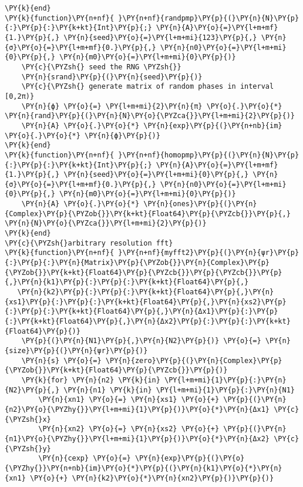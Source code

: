 \begin{Verbatim}[commandchars=\\\{\}]
\PY{k}{end}
\PY{k}{function}\PY{n+nf}{ }\PY{n+nf}{randpmp}\PY{p}{(}\PY{n}{N}\PY{p}{:}\PY{p}{:}\PY{k+kt}{Int}\PY{p}{;} \PY{n}{A}\PY{o}{=}\PY{l+m+mf}{1.}\PY{p}{,} \PY{n}{seed}\PY{o}{=}\PY{l+m+mi}{123}\PY{p}{,} \PY{n}{σ}\PY{o}{=}\PY{l+m+mf}{0.}\PY{p}{,} \PY{n}{n0}\PY{o}{=}\PY{l+m+mi}{0}\PY{p}{,} \PY{n}{m0}\PY{o}{=}\PY{l+m+mi}{0}\PY{p}{)}
    \PY{c}{\PYZsh{} seed the RNG \PYZsh{}}
    \PY{n}{srand}\PY{p}{(}\PY{n}{seed}\PY{p}{)}
    \PY{c}{\PYZsh{} generate matrix of random phases in interval [0,2π)}
    \PY{n}{ϕ} \PY{o}{=} \PY{l+m+mi}{2}\PY{n}{π} \PY{o}{.}\PY{o}{*} \PY{n}{rand}\PY{p}{(}\PY{n}{N}\PY{o}{\PYZca{}}\PY{l+m+mi}{2}\PY{p}{)}
    \PY{n}{A} \PY{o}{.}\PY{o}{*} \PY{n}{exp}\PY{p}{(}\PY{n+nb}{im} \PY{o}{.}\PY{o}{*} \PY{n}{ϕ}\PY{p}{)}
\PY{k}{end}
\PY{k}{function}\PY{n+nf}{ }\PY{n+nf}{homopmp}\PY{p}{(}\PY{n}{N}\PY{p}{:}\PY{p}{:}\PY{k+kt}{Int}\PY{p}{;} \PY{n}{A}\PY{o}{=}\PY{l+m+mf}{1.}\PY{p}{,} \PY{n}{seed}\PY{o}{=}\PY{l+m+mi}{0}\PY{p}{,} \PY{n}{σ}\PY{o}{=}\PY{l+m+mf}{0.}\PY{p}{,} \PY{n}{n0}\PY{o}{=}\PY{l+m+mi}{0}\PY{p}{,} \PY{n}{m0}\PY{o}{=}\PY{l+m+mi}{0}\PY{p}{)}
    \PY{n}{A} \PY{o}{.}\PY{o}{*} \PY{n}{ones}\PY{p}{(}\PY{n}{Complex}\PY{p}{\PYZob{}}\PY{k+kt}{Float64}\PY{p}{\PYZcb{}}\PY{p}{,} \PY{n}{N}\PY{o}{\PYZca{}}\PY{l+m+mi}{2}\PY{p}{)}
\PY{k}{end}
\PY{c}{\PYZsh{}arbitrary resolution fft}
\PY{k}{function}\PY{n+nf}{ }\PY{n+nf}{myfft2}\PY{p}{(}\PY{n}{ψr}\PY{p}{:}\PY{p}{:}\PY{n}{Matrix}\PY{p}{\PYZob{}}\PY{n}{Complex}\PY{p}{\PYZob{}}\PY{k+kt}{Float64}\PY{p}{\PYZcb{}}\PY{p}{\PYZcb{}}\PY{p}{,}\PY{n}{k1}\PY{p}{:}\PY{p}{:}\PY{k+kt}{Float64}\PY{p}{,}
   \PY{n}{k2}\PY{p}{:}\PY{p}{:}\PY{k+kt}{Float64}\PY{p}{,}\PY{n}{xs1}\PY{p}{:}\PY{p}{:}\PY{k+kt}{Float64}\PY{p}{,}\PY{n}{xs2}\PY{p}{:}\PY{p}{:}\PY{k+kt}{Float64}\PY{p}{,}\PY{n}{Δx1}\PY{p}{:}\PY{p}{:}\PY{k+kt}{Float64}\PY{p}{,}\PY{n}{Δx2}\PY{p}{:}\PY{p}{:}\PY{k+kt}{Float64}\PY{p}{)}
    \PY{p}{(}\PY{n}{N1}\PY{p}{,}\PY{n}{N2}\PY{p}{)} \PY{o}{=} \PY{n}{size}\PY{p}{(}\PY{n}{ψr}\PY{p}{)}
    \PY{n}{s} \PY{o}{=} \PY{n}{zero}\PY{p}{(}\PY{n}{Complex}\PY{p}{\PYZob{}}\PY{k+kt}{Float64}\PY{p}{\PYZcb{}}\PY{p}{)}
    \PY{k}{for} \PY{n}{n2} \PY{k}{in} \PY{l+m+mi}{1}\PY{p}{:}\PY{n}{N2}\PY{p}{,} \PY{n}{n1} \PY{k}{in} \PY{l+m+mi}{1}\PY{p}{:}\PY{n}{N1}
        \PY{n}{xn1} \PY{o}{=} \PY{n}{xs1} \PY{o}{+} \PY{p}{(}\PY{n}{n2}\PY{o}{\PYZhy{}}\PY{l+m+mi}{1}\PY{p}{)}\PY{o}{*}\PY{n}{Δx1} \PY{c}{\PYZsh{}x}
        \PY{n}{xn2} \PY{o}{=} \PY{n}{xs2} \PY{o}{+} \PY{p}{(}\PY{n}{n1}\PY{o}{\PYZhy{}}\PY{l+m+mi}{1}\PY{p}{)}\PY{o}{*}\PY{n}{Δx2} \PY{c}{\PYZsh{}y}
        \PY{n}{cexp} \PY{o}{=} \PY{n}{exp}\PY{p}{(}\PY{o}{\PYZhy{}}\PY{n+nb}{im}\PY{o}{*}\PY{p}{(}\PY{n}{k1}\PY{o}{*}\PY{n}{xn1} \PY{o}{+} \PY{n}{k2}\PY{o}{*}\PY{n}{xn2}\PY{p}{)}\PY{p}{)}

\end{Verbatim}
